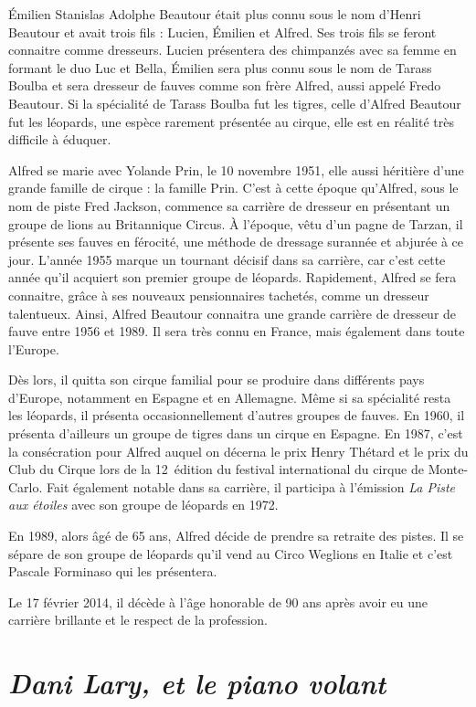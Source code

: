 Émilien Stanislas Adolphe Beautour était plus connu sous le nom d’Henri Beautour et avait trois fils : Lucien, Émilien et Alfred. Ses trois fils se feront connaitre comme dresseurs. Lucien présentera des chimpanzés avec sa femme en formant le duo Luc et Bella, Émilien sera plus connu sous le nom de Tarass Boulba et sera dresseur de fauves comme son frère Alfred, aussi appelé Fredo Beautour. Si la spécialité de Tarass Boulba fut les tigres, celle d’Alfred Beautour fut les léopards, une espèce rarement présentée au cirque, elle est en réalité très difficile à éduquer.

Alfred se marie avec Yolande Prin, le 10 novembre 1951, elle aussi héritière d’une grande famille de cirque : la famille Prin. C’est à cette époque qu’Alfred, sous le nom de piste Fred Jackson, commence sa carrière de dresseur en présentant un groupe de lions au Britannique Circus. À l’époque, vêtu d’un pagne de Tarzan, il présente ses fauves en férocité, une méthode de dressage surannée et abjurée à ce jour. L'année 1955 marque un tournant décisif dans sa carrière, car c’est cette année qu’il acquiert son premier groupe de léopards. Rapidement, Alfred se fera connaitre, grâce à ses nouveaux pensionnaires tachetés, comme un dresseur talentueux. Ainsi, Alfred Beautour connaitra une grande carrière de dresseur de fauve entre 1956 et 1989. Il sera très connu en France, mais également dans toute l’Europe.

Dès lors, il quitta son cirque familial pour se produire dans différents pays d’Europe, notamment en Espagne et en Allemagne. Même si sa spécialité resta les léopards, il présenta occasionnellement d’autres groupes de fauves. En 1960, il présenta d’ailleurs un groupe de tigres dans un cirque en Espagne. En 1987, c’est la consécration pour Alfred auquel on décerna le prix Henry Thétard et le prix du Club du Cirque lors de la 12\ieme~édition du festival international du cirque de Monte-Carlo. Fait également notable dans sa carrière, il participa à l’émission \textit{La Piste aux étoiles} avec son groupe de léopards en 1972.

En 1989, alors âgé de 65 ans, Alfred décide de prendre sa retraite des pistes. Il se sépare de son groupe de léopards qu’il vend au Circo Weglions en Italie et c’est Pascale Forminaso qui les présentera.

Le 17 février 2014, il décède à l’âge honorable de 90 ans après avoir eu une carrière brillante et le respect de la profession.

\section*{\textit{Dani Lary, et le piano volant}}
{}

